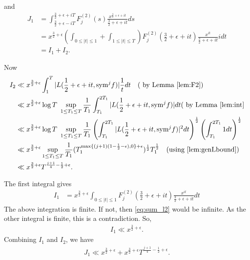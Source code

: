 \documentclass[10pt]{amsart}
\begin{document}
and
\begin{align*}
    J_1 &= \int_{\frac{3}{2}+\epsilon - iT}^{\frac{3}{2}+\epsilon+iT}F_j^{(2)}(s) \frac{x^{\frac{3}{2}+\epsilon+it}}{\frac{3}{2}+\epsilon+it}ds \\
    &= x^{\frac{3}{2}+\epsilon}\left( \int_{0\leq |t|\leq 1} + \int_{1 \leq |t| \leq T} \right)F_j^{(2)}\left(\frac{3}{2}+\epsilon+it\right) \frac{x^{it}}{\frac{3}{2}+\epsilon+it}idt\\
    &= I_1+I_2.
\end{align*}

Now \begin{align*}
    I_2 &\ll x^{\frac{3}{2}+\epsilon} \int_{1}^{T}|L(\frac{1}{2}+\epsilon+it, \mathrm{sym}^j f)| \frac{1}{t} dt \quad ( \text{ by Lemma } \ref{lem:F2})\\
    &\ll x^{\frac{3}{2}+\epsilon} \log T\text{ }\sup_{1 \leq T_1 \leq T}\frac{1}{T_1}\int_{T_1}^{2T_1}|L(\frac{1}{2}+\epsilon+it, \mathrm{sym}^j f)| dt ( \text{ by Lemma } \ref{lem:int}  \\
    & \ll x^{\frac{3}{2}+\epsilon}\log T\text{ }\sup_{1 \leq T_1 \leq T}\frac{1}{T_1} \left( \int_{T_1}^{2T_1}|L(\frac{1}{2}+\epsilon+it, \mathrm{sym}^j f)|^2 dt \right)^{\frac{1}{2}}\left( \int_{T_1}^{2T_1} 1 dt \right)^{\frac{1}{2}} \\
    & \ll x^{\frac{3}{2}+\epsilon} \sup_{1 \leq T_1 \leq T}\frac{1}{T_1}(T_1^{\max\{(j+1)(1-\frac{1}{2}-\epsilon), 0\} + \epsilon})^{\frac{1}{2}}T_1^\frac{1}{2} \quad \text{(using \ref{lem:genLbound})} \\
    & \ll x^{\frac{3}{2}+\epsilon}T^{\frac{j+1}{4}-\frac{1}{2}+\epsilon}.
\end{align*}

The first integral gives \begin{align*}
    I_1 &= x^{\frac{3}{2}+\epsilon}\int_{0 \leq |t| \leq 1}F_j^{(2)}\left(\frac{3}{2}+\epsilon+it\right) \frac{x^{it}}{\frac{3}{2}+\epsilon+it}dt
    \end{align*}
    The above integration is finite. If not, then \eqref{eq:sum_l2} would be infinite. As the other integral is finite, this is a contradiction. So,
    \begin{align*}
        I_1 \ll x^{\frac{3}{2}+\epsilon}.
    \end{align*}
Combining $I_1$ and $I_2$, we have \begin{align}
    J_1 \ll x^{\frac{3}{2}+\epsilon} + x^{\frac{3}{2}+\epsilon} T^{\frac{j+1}{4}-\frac{1}{2}+\epsilon}.
\end{align}
\end{document}
